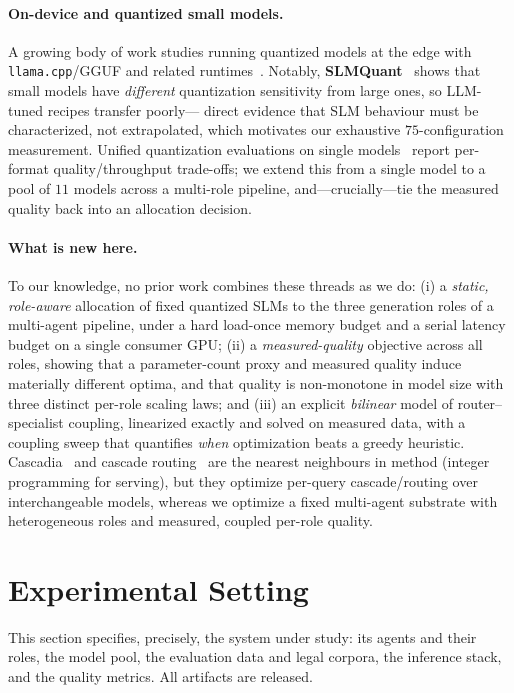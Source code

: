 \documentclass[11pt]{article}
\begin{document}
\paragraph{On-device and quantized small models.}
A growing body of work studies running quantized models at the edge with
\texttt{llama.cpp}/GGUF and related runtimes~\cite{edgeslm,ondevicellm}. Notably,
\textbf{SLMQuant}~\cite{slmquant} shows that small models have \emph{different}
quantization sensitivity from large ones, so LLM-tuned recipes transfer poorly---
direct evidence that SLM behaviour must be characterized, not extrapolated, which
motivates our exhaustive $75$-configuration measurement. Unified quantization
evaluations on single models~\cite{quanteval} report per-format quality/throughput
trade-offs; we extend this from a single model to a pool of $11$ models across a
multi-role pipeline, and---crucially---tie the measured quality back into an
allocation decision.

\paragraph{What is new here.}
To our knowledge, no prior work combines these threads as we do: (i) a \emph{static,
role-aware} allocation of fixed quantized SLMs to the three generation roles of a
multi-agent pipeline, under a hard load-once memory budget and a serial latency
budget on a single consumer GPU; (ii) a \emph{measured-quality} objective across all
roles, showing that a parameter-count proxy and measured quality induce materially
different optima, and that quality is non-monotone in model size with three distinct
per-role scaling laws; and (iii) an explicit \emph{bilinear} model of
router--specialist coupling, linearized exactly and solved on measured data, with a
coupling sweep that quantifies \emph{when} optimization beats a greedy heuristic.
Cascadia~\cite{cascadia} and cascade routing~\cite{cascaderouting} are the nearest
neighbours in method (integer programming for serving), but they optimize per-query
cascade/routing over interchangeable models, whereas we optimize a fixed multi-agent
substrate with heterogeneous roles and measured, coupled per-role quality.

\section{Experimental Setting}
\label{sec:setting}
This section specifies, precisely, the system under study: its agents and their
roles, the model pool, the evaluation data and legal corpora, the inference
stack, and the quality metrics. All artifacts are released.
\end{document}
